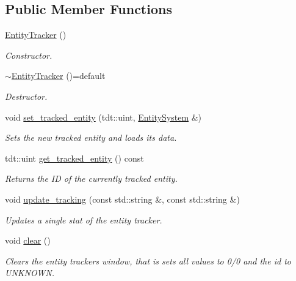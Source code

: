 \subsection*{Public Member Functions}
\begin{DoxyCompactItemize}
\item 
\hyperlink{class_entity_tracker_af562bdb32acbf38e49d146414aefcae7}{Entity\+Tracker} ()
\begin{DoxyCompactList}\small\item\em Constructor. \end{DoxyCompactList}\item 
\hyperlink{class_entity_tracker_a1325c2319379220142156dbb567d45ba}{$\sim$\+Entity\+Tracker} ()=default
\begin{DoxyCompactList}\small\item\em Destructor. \end{DoxyCompactList}\item 
void \hyperlink{class_entity_tracker_abff80cf0f55c307745c5f88f219099a1}{set\+\_\+tracked\+\_\+entity} (tdt\+::uint, \hyperlink{class_entity_system}{Entity\+System} \&)
\begin{DoxyCompactList}\small\item\em Sets the new tracked entity and loads it\textquotesingle{}s data. \end{DoxyCompactList}\item 
tdt\+::uint \hyperlink{class_entity_tracker_ab51ce2487826c578c1b99dbbeae622dc}{get\+\_\+tracked\+\_\+entity} () const 
\begin{DoxyCompactList}\small\item\em Returns the ID of the currently tracked entity. \end{DoxyCompactList}\item 
void \hyperlink{class_entity_tracker_a71f7a58fe7988b4f94fe272a5022f088}{update\+\_\+tracking} (const std\+::string \&, const std\+::string \&)
\begin{DoxyCompactList}\small\item\em Updates a single stat of the entity tracker. \end{DoxyCompactList}\item 
void \hyperlink{class_entity_tracker_a7acaffc973bc0f3de2a1429de72cf825}{clear} ()
\begin{DoxyCompactList}\small\item\em Clears the entity tracker\textquotesingle{}s window, that is sets all values to 0/0 and the id to U\+N\+K\+N\+O\+WN. \end{DoxyCompactList}\item 

\end{DoxyCompactItemize}

